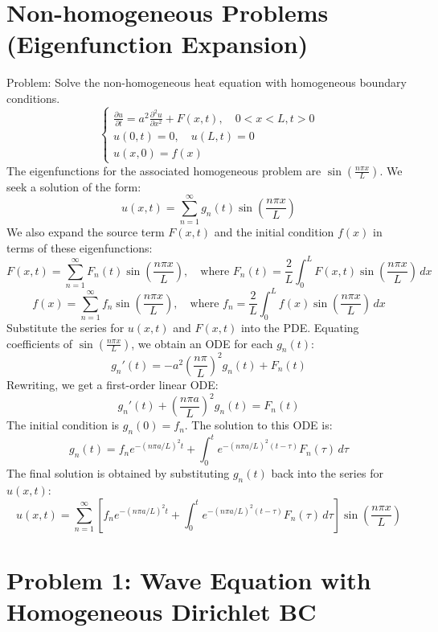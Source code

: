\documentclass{article}
\begin{document}
	\section{Non-homogeneous Problems (Eigenfunction Expansion)}
	Problem: Solve the non-homogeneous heat equation with homogeneous boundary conditions.
	$$
	\begin{cases}
		\frac{\partial u}{\partial t} = a^2 \frac{\partial^2 u}{\partial x^2} + F(x,t), \quad 0<x<L, t>0 \\
		u(0,t)=0, \quad u(L,t)=0 \\
		u(x,0)=f(x)
	\end{cases}
	$$
	The eigenfunctions for the associated homogeneous problem are $\sin\left(\frac{n\pi x}{L}\right)$. We seek a solution of the form:
	$$
	u(x,t) = \sum_{n=1}^\infty g_n(t) \sin\left(\frac{n\pi x}{L}\right)
	$$
	We also expand the source term $F(x,t)$ and the initial condition $f(x)$ in terms of these eigenfunctions:
	$$
	F(x,t) = \sum_{n=1}^\infty F_n(t) \sin\left(\frac{n\pi x}{L}\right), \quad \text{where } F_n(t) = \frac{2}{L}\int_0^L F(x,t)\sin\left(\frac{n\pi x}{L}\right)\,dx
	$$
	$$
	f(x) = \sum_{n=1}^\infty f_n \sin\left(\frac{n\pi x}{L}\right), \quad \text{where } f_n = \frac{2}{L}\int_0^L f(x)\sin\left(\frac{n\pi x}{L}\right)\,dx
	$$
	Substitute the series for $u(x,t)$ and $F(x,t)$ into the PDE. Equating coefficients of $\sin\left(\frac{n\pi x}{L}\right)$, we obtain an ODE for each $g_n(t)$:
	$$
	g_n'(t) = -a^2\left(\frac{n\pi}{L}\right)^2 g_n(t) + F_n(t)
	$$
	Rewriting, we get a first-order linear ODE:
	$$
	g_n'(t) + \left(\frac{n\pi a}{L}\right)^2 g_n(t) = F_n(t)
	$$
	The initial condition is $g_n(0) = f_n$. The solution to this ODE is:
	$$
	g_n(t) = f_n e^{-(n\pi a/L)^2 t} + \int_0^t e^{-(n\pi a/L)^2(t-\tau)} F_n(\tau) \,d\tau
	$$
	The final solution is obtained by substituting $g_n(t)$ back into the series for $u(x,t)$:
	$$
	u(x,t) = \sum_{n=1}^\infty \left[ f_n e^{-(n\pi a/L)^2 t} + \int_0^t e^{-(n\pi a/L)^2(t-\tau)} F_n(\tau) \,d\tau \right] \sin\left(\frac{n\pi x}{L}\right)
	$$
	\section*{Problem 1: Wave Equation with Homogeneous Dirichlet BC}
	
\end{document}
